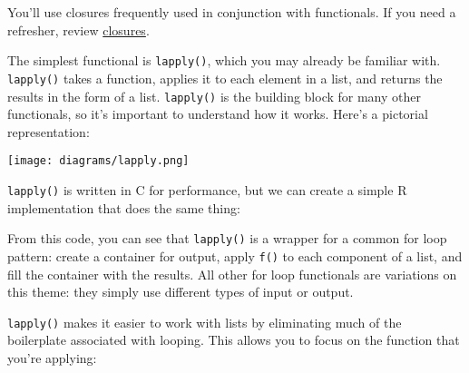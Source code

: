 You'll use closures frequently used in conjunction with functionals. If
you need a refresher, review \hyperref[closures]{closures}.


The simplest functional is \texttt{lapply()}, which you may already be
familiar with. \texttt{lapply()} takes a function, applies it to each
element in a list, and returns the results in the form of a list.
\texttt{lapply()} is the building block for many other functionals, so
it's important to understand how it works. Here's a pictorial
representation: 

\texttt{[image: diagrams/lapply.png]}

\texttt{lapply()} is written in C for performance, but we can create a
simple R implementation that does the same thing:

\begin{Shaded}
\begin{Highlighting}[]
\StringTok{ }
  \StringTok{ }\NormalTok{(}\NormalTok{, }
    \StringTok{ }
  \NormalTok{\}}
\NormalTok{\}}
\end{Highlighting}
\end{Shaded}

From this code, you can see that \texttt{lapply()} is a wrapper for a
common for loop pattern: create a container for output, apply
\texttt{f()} to each component of a list, and fill the container with
the results. All other for loop functionals are variations on this
theme: they simply use different types of input or output.

\texttt{lapply()} makes it easier to work with lists by eliminating much
of the boilerplate associated with looping. This allows you to focus on
the function that you're applying:

